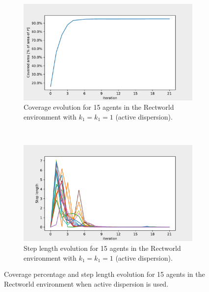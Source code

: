 \begin{figure}[H]
  \centering
  \begin{subfigure}[t]{0.5\textwidth}
    \centering
    \includegraphics[width=\textwidth]{figs/bigworld_15_agnt_k_1_1_k_2_1_area_traj.pdf}
    \caption{Coverage evolution for 15 agents in the Rectworld environment with $k_{1} = k_{1} = 1$ (active dispersion).}
    \label{fig:15_agnt_bw_k_1_1_a_traj}
  \end{subfigure}%
  ~ 
  \begin{subfigure}[t]{0.5\textwidth}
    \centering
    \includegraphics[width=\textwidth]{figs/bigworld_15_agnt_k_1_1_k_2_1_step_traj.pdf}
    \caption{Step length evolution for 15 agents in the Rectworld environment with $k_{1} = k_{1} = 1$ (active dispersion).}
    \label{fig:15_agnt_bw_k_1_1_s_traj}
  \end{subfigure}
  \caption{Coverage percentage and step length evolution for 15 agents in the Rectworld environment when active dispersion is used.}
  \label{fig:15_agnt_bw_evolution_active}
\end{figure}